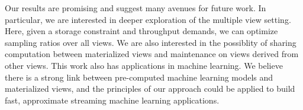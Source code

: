 Our results are promising and suggest many avenues for future work.
In particular, we are interested in deeper exploration of the multiple view setting.
Here, given a storage constraint and throughput demands, we can optimize sampling ratios over all views.
We are also interested in the possiblity of sharing computation between materialized views and maintenance on views derived from other views.
This work also has applications in machine learning.
We believe there is a strong link between pre-computed machine learning models and materialized views, and the principles of our approach could be applied
to build fast, approximate streaming machine learning applications.



